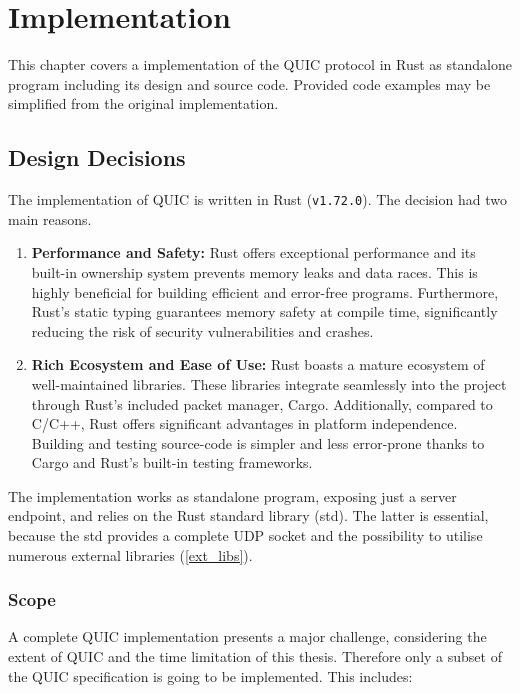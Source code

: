 \chapter{Implementation}

This chapter covers a implementation of the QUIC protocol in Rust as standalone program including its design and source code. Provided code examples may be simplified from the original implementation. 

\section{Design Decisions}

The implementation of QUIC is written in Rust (\lstinline{v1.72.0}). The decision had two main reasons.
\begingroup
\renewcommand\labelenumi{(\theenumi)}
\begin{enumerate}
\item \textbf{Performance and Safety:} Rust offers exceptional performance and its built-in ownership system prevents memory leaks and data races. This is highly beneficial for building efficient and error-free programs. Furthermore, Rust's static typing guarantees memory safety at compile time, significantly reducing the risk of security vulnerabilities and crashes.
\item \textbf{Rich Ecosystem and Ease of Use:} Rust boasts a mature ecosystem of well-maintained libraries. These libraries integrate seamlessly into the project through Rust's included packet manager, Cargo. Additionally, compared to C/C++, Rust offers significant advantages in platform independence. Building and testing source-code is simpler and less error-prone thanks to Cargo and Rust's built-in testing frameworks.
\end{enumerate}
\endgroup

The implementation works as standalone program, exposing just a server endpoint, and relies on the Rust standard library (std). The latter is essential, because the std provides a complete UDP socket and the possibility to utilise numerous external libraries (\ref{ext_libs}).

\subsection{Scope}

A complete QUIC implementation presents a major challenge, considering the extent of QUIC and the time limitation of this thesis. Therefore only a subset of the QUIC specification is going to be implemented. This includes:

